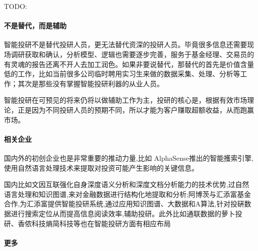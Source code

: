 \documentclass[letterpaper,10pt,english]{sphinxmanual}
\begin{document}
TODO:%
\begin{footnote}[1118]\sphinxAtStartFootnote
{}
%
\end{footnote}


\paragraph{不是替代，而是辅助}
\label{\detokenize{chapter_AI+Finance/AI_Investment_Research:id8}}
智能投研不是替代投研人员，更无法替代资深的投研人员。毕竟很多信息还需要现场调研获取和确认，分析模型、逻辑也需要逐步完善，服务于基金经理、交易员的有灵魂的报告还离不开人去加工润色。如果非要说替代，那替代的首先是价值含量低的工作，比如当前很多公司临时聘用实习生来做的数据采集、处理、分析等工作；其次是那些没有掌握智能投研利器的从业人员。

智能投研在可预见的将来仍将以做辅助工作为主，投研的核心是，根据有效市场理论，正是因为不同投研人员的预期不同，所以才能为客户赚取超额收益，从而跑赢市场。


\paragraph{相关企业}
\label{\detokenize{chapter_AI+Finance/AI_Investment_Research:id9}}
国内外的初创企业也是非常重要的推动力量,比如
AlphaSense推出的智能擭索引擎,使用自然语言处理技术来提取对投资可能产生影响的关键信息。

国内比如文因互联强化自身深度语义分析和深度文档分析能力的技术优势,过自然语言处理和知识图谱,来对金融数据进行结构化地提取和分析;阿博茨与汇添富基金合作,为汇添富提供智能投研系统,通过应用知识图谱、大数据和A算法,针对投硏数据进行搜索定位从而提高信息阅读效率,辅助投研。此外比如通联数据的萝卜投研、香侬科技熵简科技等也在智能投研方面有相应布局%
\begin{footnote}[1119]\sphinxAtStartFootnote
{}
%
\end{footnote}


\paragraph{更多}
\label{\detokenize{chapter_AI+Finance/AI_Investment_Research:id10}}
\end{document}
